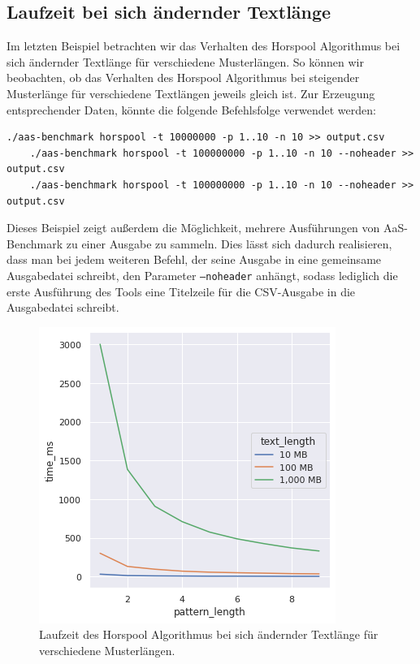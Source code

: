 \documentclass[twocolumn]{article}
\begin{document}
\subsection*{Laufzeit bei sich ändernder Textlänge}

Im letzten Beispiel betrachten wir das Verhalten des Horspool Algorithmus bei sich ändernder Textlänge für verschiedene Musterlängen. So können wir beobachten, ob das Verhalten des Horspool Algorithmus bei steigender Musterlänge für verschiedene Textlängen jeweils gleich ist. Zur Erzeugung entsprechender Daten, könnte die folgende Befehlsfolge verwendet werden:

\begin{lstlisting}[breaklines=true,autogobble=true]
    ./aas-benchmark horspool -t 10000000 -p 1..10 -n 10 >> output.csv
    ./aas-benchmark horspool -t 100000000 -p 1..10 -n 10 --noheader >> output.csv
    ./aas-benchmark horspool -t 100000000 -p 1..10 -n 10 --noheader >> output.csv
\end{lstlisting}

Dieses Beispiel zeigt außerdem die Möglichkeit, mehrere Ausführungen von AaS-Benchmark zu einer Ausgabe zu sammeln. Dies lässt sich dadurch realisieren, dass man bei jedem weiteren Befehl, der seine Ausgabe in eine gemeinsame Ausgabedatei schreibt, den Parameter \texttt{---noheader} anhängt, sodass lediglich die erste Ausführung des Tools eine Titelzeile für die CSV-Ausgabe in die Ausgabedatei schreibt.

\begin{figure}
    \includegraphics[width=\linewidth]{assets/graph_4.png}
    \caption{Laufzeit des Horspool Algorithmus bei sich ändernder Textlänge für verschiedene Musterlängen.}
    \label{fig:runtime_bndm_shift_and}
\end{figure}
\end{document}
